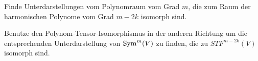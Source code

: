 \begin{sheet}
\begin{problem}[title={Isomorphismus zwischen irreduziblen Darstellungen von Polynomen und Tensoren}]
\begin{subproblem}
Finde Unterdarstellungen vom Polynomraum vom Grad $m$, die zum Raum der harmonischen Polynome vom Grad $m-2k$ isomorph sind.
\end{subproblem}
\begin{subproblem}
Benutze den Polynom-Tensor-Isomorphismus in der anderen Richtung um die entsprechenden Unterdarstellung von $\operatorname{Sym}^m(V)$ zu finden, die zu $STF^{m-2k}(V)$ isomorph sind.
\end{subproblem}
\end{problem}

\end{sheet}